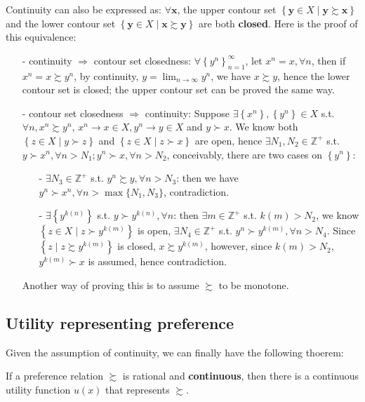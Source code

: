 Continuity can also be expressed as: $\forall \mathbf{x}$, the upper contour set $\left\{\mathbf{y}\in X\mid \mathbf{y}\succsim \mathbf{x} \right\}$ and the lower contour set $\left\{\mathbf{y}\in X\mid \mathbf{x}\succsim \mathbf{y} \right\}$ are both \textbf{closed}. Here is the proof of this equivalence: 
\begin{enumerate}
    \item[-] continuity $\Rightarrow$ contour set closedness: $\forall \left\{y^n\right\}^{\infty}_{n=1}$, let $x^n=x,\forall n$, then if $x^n=x\succsim y^n$, by continuity, $y=\lim_{n\rightarrow \infty}y^n$, we have $x\succsim y$, hence the lower contour set is closed; the upper contour set can be proved the same way.
    \item[-] contour set closedness $\Rightarrow$ continuity: Suppose $\exists \left\{x^n\right\},\left\{y^n\right\}\in X$ s.t. $\forall n, x^n\succsim y^n$, $x^n\rightarrow x\in X, y^n\rightarrow y\in X$ and $y\succ x$. We know both $\left\{z\in X\mid y\succ z \right\}$ and $\left\{z\in X\mid z\succ x \right\}$ are open, hence $\exists N_1,N_2\in \mathbb{Z}^+$ s.t. $y\succ x^n,\forall n>N_1; y^n\succ x,\forall n>N_2$, conceivably, there are two cases on $\left\{y^n\right\}$:
    \begin{enumerate}
        \item[-] $\exists N_3 \in \mathbb{Z}^+$ s.t. $y^n\succsim y, \forall n>N_3$: then we have $y^n\succ x^n,\forall n>\max\{N_1,N_3\}$, contradiction.
        \item[-] $\exists \left\{y^{k(n)}\right\}$ s.t. $y\succ y^{k(n)},\forall n$: then $\exists m\in \mathbb{Z}^+$ s.t. $k(m)>N_2$, we know $\left\{z\in X\mid z\succ y^{k(m)}\right\}$ is open, $\exists N_4\in \mathbb{Z}^+$ s.t. $y^n\succ y^{k(m)}, \forall n>N_4$. Since $\left\{z\mid z\succsim y^{k(m)}\right\}$ is closed, $x\succsim y^{k(m)}$, however, since $k(m)>N_2$, $y^{k(m)}\succ x$ is assumed, hence contradiction.
    \end{enumerate} 
    Another way of proving this is to assume $\succsim$ to be monotone.
\end{enumerate}

\subsection{Utility representing preference}
Given the assumption of continuity, we can finally have the following thoerem:
\begin{theorem}
    If a preference relation $\succsim$ is rational and \textbf{continuous}, then there is a continuous utility function $u(x)$ that represents $\succsim$.
\end{theorem}

